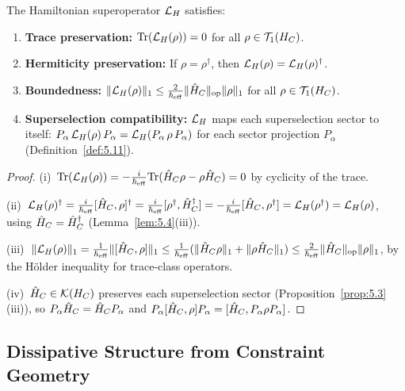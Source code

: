 \begin{lemma}[Properties of $\CL_H$]
\label{lem:7.1}
The Hamiltonian superoperator $\CL_H$ satisfies:
\begin{enumerate}
  \item[\textup{(i)}] \textbf{Trace preservation:}
    $\mathrm{Tr}(\mathcal{L}_H(\rho)) = 0$ for all $\rho \in \mathcal{T}_1(H_C)$.
  \item[\textup{(ii)}] \textbf{Hermiticity preservation:}
    If $\rho = \rho^\dagger$, then $\mathcal{L}_H(\rho) = \mathcal{L}_H(\rho)^\dagger$.
  \item[\textup{(iii)}] \textbf{Boundedness:}
    $\|\mathcal{L}_H(\rho)\|_1 \leq \frac{2}{\hbar_{\mathrm{eff}}}
    \|\hat{H}_C\|_{\mathrm{op}} \|\rho\|_1$ for all
    $\rho \in \mathcal{T}_1(H_C)$.
  \item[\textup{(iv)}] \textbf{Superselection compatibility:}
    $\CL_H$ maps each superselection sector to itself:
    $P_\alpha\,\mathcal{L}_H(\rho)\,P_\alpha = \mathcal{L}_H(P_\alpha\,\rho\,P_\alpha)$
    for each sector projection $P_\alpha$
    \textup{(}Definition~\textup{\ref{def:5.11})}.
\end{enumerate}
\end{lemma}

\begin{proof}
(i)~$\mathrm{Tr}(\mathcal{L}_H(\rho)) = -\frac{i}{\hbar_{\mathrm{eff}}}
\mathrm{Tr}(\hat{H}_C\rho - \rho\hat{H}_C) = 0$ by cyclicity of the trace.

(ii)~$\mathcal{L}_H(\rho)^\dagger = \frac{i}{\hbar_{\mathrm{eff}}}
[\hat{H}_C, \rho]^\dagger = \frac{i}{\hbar_{\mathrm{eff}}}
[\rho^\dagger, \hat{H}_C^\dagger] =
-\frac{i}{\hbar_{\mathrm{eff}}}[\hat{H}_C, \rho^\dagger]
= \mathcal{L}_H(\rho^\dagger) = \mathcal{L}_H(\rho)$,
using $\hat{H}_C = \hat{H}_C^\dagger$ (Lemma~\ref{lem:5.4}(iii)).

(iii)~$\|\mathcal{L}_H(\rho)\|_1 = \frac{1}{\hbar_{\mathrm{eff}}}
\|[\hat{H}_C, \rho]\|_1 \leq \frac{1}{\hbar_{\mathrm{eff}}}
(\|\hat{H}_C\rho\|_1 + \|\rho\hat{H}_C\|_1)
\leq \frac{2}{\hbar_{\mathrm{eff}}} \|\hat{H}_C\|_{\mathrm{op}}
\|\rho\|_1$, by the H\"older inequality for trace-class operators.

(iv)~$\hat{H}_C \in \mathcal{K}(H_C)$ preserves each superselection sector
(Proposition~\ref{prop:5.3}(iii)), so $P_\alpha \hat{H}_C = \hat{H}_C
P_\alpha$ and $P_\alpha[\hat{H}_C, \rho]P_\alpha =
[\hat{H}_C, P_\alpha\rho P_\alpha]$.
\end{proof}

\subsection{Dissipative Structure from Constraint Geometry}
\label{sec:ch7:dissipator}

